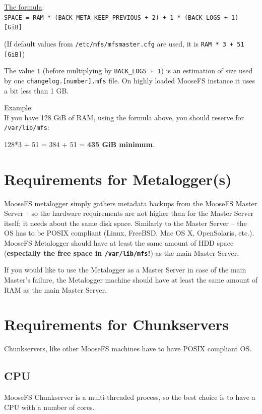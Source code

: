 \documentclass[a4paper,11pt,english]{report}
\def\code#1{\texttt{#1}}
\begin{document}
			\bigskip
			\underline{The formula}: \\
			\code{SPACE = RAM * (BACK\_META\_KEEP\_PREVIOUS + 2) + 1 * (BACK\_LOGS + 1) [GiB]}
			\bigskip
			
			(If default values from \code{/etc/mfs/mfsmaster.cfg} are used, it is \code{RAM * 3 + 51 [GiB]})
			
			The value \code{1} (before multiplying by \code{BACK\_LOGS + 1}) is an estimation of size used by one \code{changelog.[number].mfs} file. On highly loaded MooseFS instance it uses a bit less than 1 GB.
			
			\underline{Example}: \\
			If you have 128 GiB of RAM, using the formula above, you should reserve for \code{/var/lib/mfs}:
			
			128*3 + 51 = 384 + 51 = \textbf{435 GiB minimum}.
		
		\section{Requirements for Metalogger(s)}
		MooseFS metalogger simply gathers metadata backups from the MooseFS Master Server -- so the hardware requirements are not higher than for the Master Server itself; it needs about the same disk space. Similarly to the Master Server -- the OS has to be POSIX compliant (Linux, FreeBSD, Mac OS X, OpenSolaris, etc.).\\
		
		MooseFS Metalogger should have at least the same amount of HDD space (\textbf{especially the free space in \code{/var/lib/mfs}!}) as the main Master Server.
		
		If you would like to use the Metalogger as a Master Server in case of the main Master's failure, the Metalogger machine should have at least the same amount of RAM as the main Master Server.

		\section{Requirements for Chunkservers}
		Chunkservers, like other MooseFS machines have to have POSIX compliant OS.
		
			\subsection{CPU}
			MooseFS Chunkserver is a multi-threaded process, so the best choice is to have a CPU with a number of cores.
			
\end{document}
